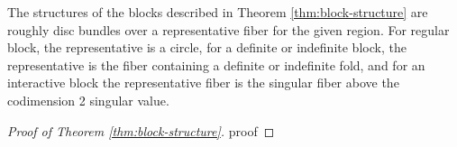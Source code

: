 \begin{rmk}
	The structures of the blocks described in Theorem \ref{thm:block-structure} are roughly disc bundles over a representative fiber for the given region.
	For regular block, the representative is a circle, for a definite or indefinite block, the representative is the fiber containing a definite or indefinite fold, and for an interactive block the representative fiber is the singular fiber above the codimension 2 singular value.
\end{rmk}

\begin{proof}[Proof of Theorem \ref{thm:block-structure}]
	proof
\end{proof}
